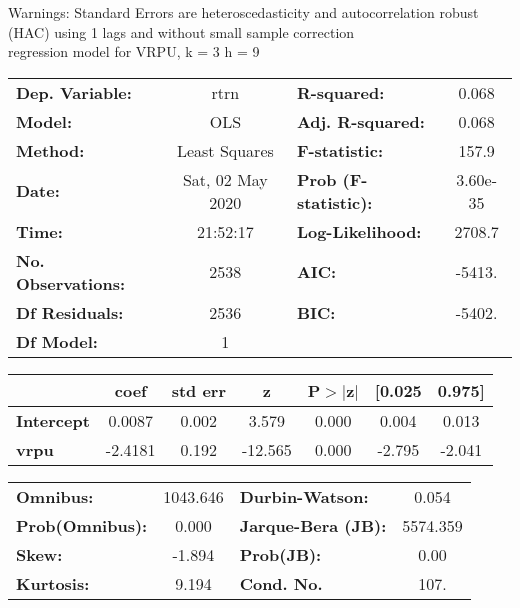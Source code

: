 Warnings: \newline
 [1] Standard Errors are heteroscedasticity and autocorrelation robust (HAC) using 1 lags and without small sample correction\\ 

regression model for VRPU, k = 3 h = 9\begin{center}
\begin{tabular}{lclc}
\toprule
\textbf{Dep. Variable:}    &       rtrn       & \textbf{  R-squared:         } &     0.068   \\
\textbf{Model:}            &       OLS        & \textbf{  Adj. R-squared:    } &     0.068   \\
\textbf{Method:}           &  Least Squares   & \textbf{  F-statistic:       } &     157.9   \\
\textbf{Date:}             & Sat, 02 May 2020 & \textbf{  Prob (F-statistic):} &  3.60e-35   \\
\textbf{Time:}             &     21:52:17     & \textbf{  Log-Likelihood:    } &    2708.7   \\
\textbf{No. Observations:} &        2538      & \textbf{  AIC:               } &    -5413.   \\
\textbf{Df Residuals:}     &        2536      & \textbf{  BIC:               } &    -5402.   \\
\textbf{Df Model:}         &           1      & \textbf{                     } &             \\
\bottomrule
\end{tabular}
\begin{tabular}{lcccccc}
                   & \textbf{coef} & \textbf{std err} & \textbf{z} & \textbf{P$> |$z$|$} & \textbf{[0.025} & \textbf{0.975]}  \\
\midrule
\textbf{Intercept} &       0.0087  &        0.002     &     3.579  &         0.000        &        0.004    &        0.013     \\
\textbf{vrpu}      &      -2.4181  &        0.192     &   -12.565  &         0.000        &       -2.795    &       -2.041     \\
\bottomrule
\end{tabular}
\begin{tabular}{lclc}
\textbf{Omnibus:}       & 1043.646 & \textbf{  Durbin-Watson:     } &    0.054  \\
\textbf{Prob(Omnibus):} &   0.000  & \textbf{  Jarque-Bera (JB):  } & 5574.359  \\
\textbf{Skew:}          &  -1.894  & \textbf{  Prob(JB):          } &     0.00  \\
\textbf{Kurtosis:}      &   9.194  & \textbf{  Cond. No.          } &     107.  \\
\bottomrule
\end{tabular}
\end{center}

